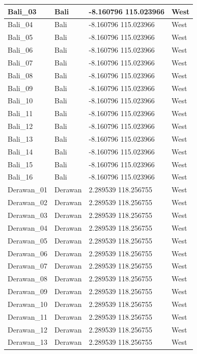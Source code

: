 \documentclass[
]{article}
\begin{document}
\begin{table}
\begin{tabular}{l|l|l|l}
\hline
Bali\_03 & Bali & -8.160796 115.023966 & West\\
\hline
Bali\_04 & Bali & -8.160796 115.023966 & West\\
\hline
Bali\_05 & Bali & -8.160796 115.023966 & West\\
\hline
Bali\_06 & Bali & -8.160796 115.023966 & West\\
\hline
Bali\_07 & Bali & -8.160796 115.023966 & West\\
\hline
Bali\_08 & Bali & -8.160796 115.023966 & West\\
\hline
Bali\_09 & Bali & -8.160796 115.023966 & West\\
\hline
Bali\_10 & Bali & -8.160796 115.023966 & West\\
\hline
Bali\_11 & Bali & -8.160796 115.023966 & West\\
\hline
Bali\_12 & Bali & -8.160796 115.023966 & West\\
\hline
Bali\_13 & Bali & -8.160796 115.023966 & West\\
\hline
Bali\_14 & Bali & -8.160796 115.023966 & West\\
\hline
Bali\_15 & Bali & -8.160796 115.023966 & West\\
\hline
Bali\_16 & Bali & -8.160796 115.023966 & West\\
\hline
Derawan\_01 & Derawan & 2.289539 118.256755 & West\\
\hline
Derawan\_02 & Derawan & 2.289539 118.256755 & West\\
\hline
Derawan\_03 & Derawan & 2.289539 118.256755 & West\\
\hline
Derawan\_04 & Derawan & 2.289539 118.256755 & West\\
\hline
Derawan\_05 & Derawan & 2.289539 118.256755 & West\\
\hline
Derawan\_06 & Derawan & 2.289539 118.256755 & West\\
\hline
Derawan\_07 & Derawan & 2.289539 118.256755 & West\\
\hline
Derawan\_08 & Derawan & 2.289539 118.256755 & West\\
\hline
Derawan\_09 & Derawan & 2.289539 118.256755 & West\\
\hline
Derawan\_10 & Derawan & 2.289539 118.256755 & West\\
\hline
Derawan\_11 & Derawan & 2.289539 118.256755 & West\\
\hline
Derawan\_12 & Derawan & 2.289539 118.256755 & West\\
\hline
Derawan\_13 & Derawan & 2.289539 118.256755 & West\\

\end{tabular}
\end{table}
\end{document}
